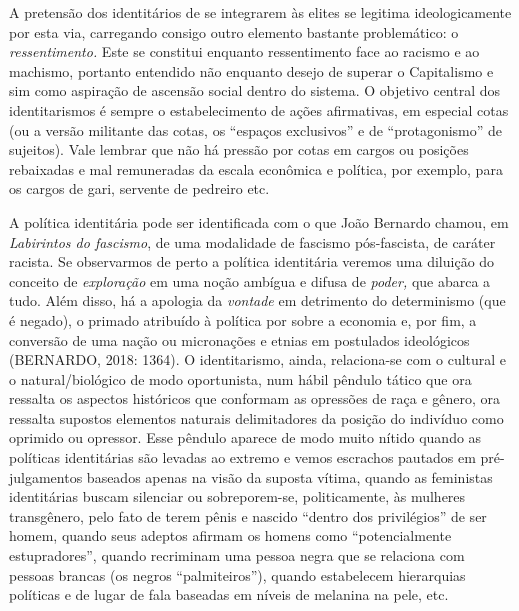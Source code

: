 A pretensão dos identitários de se integrarem às elites se legitima
ideologicamente por esta via, carregando consigo outro elemento bastante
problemático: o \emph{ressentimento.} Este se constitui enquanto
ressentimento face ao racismo e ao machismo, portanto entendido não
enquanto desejo de superar o Capitalismo e sim como aspiração de
ascensão social dentro do sistema. O objetivo central dos identitarismos
é sempre o estabelecimento de ações afirmativas, em especial cotas (ou a
versão militante das cotas, os ``espaços exclusivos'' e de
``protagonismo'' de sujeitos). Vale lembrar que não há pressão por cotas
em cargos ou posições rebaixadas e mal remuneradas da escala econômica e
política, por exemplo, para os cargos de gari, servente de pedreiro etc.

A política identitária pode ser identificada com o que João Bernardo
chamou, em \emph{Labirintos do fascismo}, de uma modalidade de fascismo
pós-fascista, de caráter racista. Se observarmos de perto a política
identitária veremos uma diluição do conceito de \emph{exploração} em uma
noção ambígua e difusa de \emph{poder,} que abarca a tudo. Além disso,
há a apologia da \emph{vontade} em detrimento do determinismo (que é
negado), o primado atribuído à política por sobre a economia e, por fim,
a conversão de uma nação ou micronações e etnias em postulados
ideológicos (BERNARDO, 2018: 1364). O identitarismo, ainda, relaciona-se
com o cultural e o natural/biológico de modo oportunista, num hábil
pêndulo tático que ora ressalta os aspectos históricos que conformam as
opressões de raça e gênero, ora ressalta supostos elementos naturais
delimitadores da posição do indivíduo como oprimido ou opressor. Esse
pêndulo aparece de modo muito nítido quando as políticas identitárias
são levadas ao extremo e vemos escrachos pautados em pré-julgamentos
baseados apenas na visão da suposta vítima, quando as feministas
identitárias buscam silenciar ou sobreporem-se, politicamente, às
mulheres transgênero, pelo fato de terem pênis e nascido ``dentro dos
privilégios'' de ser homem, quando seus adeptos afirmam os homens como
``potencialmente estupradores'', quando recriminam uma pessoa negra que
se relaciona com pessoas brancas (os negros ``palmiteiros''), quando
estabelecem hierarquias políticas e de lugar de fala baseadas em níveis
de melanina na pele, etc.

